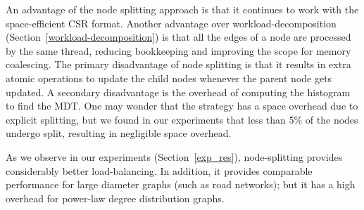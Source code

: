 An advantage of the node splitting approach is that it continues to work with the space-efficient CSR format.
Another advantage over workload-decomposition (Section~\ref{workload-decomposition}) is that all the edges of a node are processed by the same thread, reducing bookkeeping and improving the scope for memory coalescing.
The primary disadvantage of node splitting is that it results in extra atomic operations to update the child nodes whenever the parent node gets updated.
A secondary disadvantage is the overhead of computing the histogram to find the MDT.
One may wonder that the strategy has a space overhead due to explicit splitting, but we found in our experiments that less than 5\% of the nodes undergo split, resulting in negligible space overhead.

As we observe in our experiments (Section~\ref{exp_res}), node-splitting provides considerably better load-balancing.
In addition, it provides comparable performance for large diameter graphs (such as road networks); but it has a high overhead for power-law degree distribution graphs.


